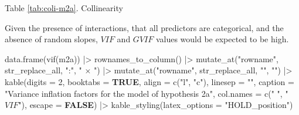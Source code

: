 \documentclass[
  bookmarksnumbered]{article}
\newenvironment{Shaded}{\begin{snugshade}}{\end{snugshade}}
\newcommand{\AttributeTok}[1]{\textcolor[rgb]{0.80,0.80,0.80}{#1}}
\newcommand{\ConstantTok}[1]{\textcolor[rgb]{0.86,0.64,0.64}{\textbf{#1}}}
\newcommand{\DecValTok}[1]{\textcolor[rgb]{0.86,0.86,0.80}{#1}}
\newcommand{\FunctionTok}[1]{\textcolor[rgb]{0.94,0.94,0.56}{#1}}
\newcommand{\NormalTok}[1]{\textcolor[rgb]{0.80,0.80,0.80}{#1}}
\newcommand{\SpecialCharTok}[1]{\textcolor[rgb]{0.86,0.64,0.64}{#1}}
\newcommand{\StringTok}[1]{\textcolor[rgb]{0.80,0.58,0.58}{#1}}
\begin{document}
Table \ref{tab:coli-m2a}. Collinearity

Given the presence of interactions, that all predictors are categorical, and the absence of random slopes, \(VIF\) and \(GVIF\) values would be expected to be high.

\begin{Shaded}
\begin{Highlighting}[]
\FunctionTok{data.frame}\NormalTok{(}\FunctionTok{vif}\NormalTok{(m2a)) }\SpecialCharTok{|\textgreater{}} 
  \FunctionTok{rownames\_to\_column}\NormalTok{() }\SpecialCharTok{|\textgreater{}} 
  \FunctionTok{mutate\_at}\NormalTok{(}\StringTok{"rowname"}\NormalTok{, str\_replace\_all, }\StringTok{":"}\NormalTok{, }\StringTok{" × "}\NormalTok{) }\SpecialCharTok{|\textgreater{}}
  \FunctionTok{mutate\_at}\NormalTok{(}\StringTok{"rowname"}\NormalTok{, str\_replace\_all, }\StringTok{"\textasciigrave{}"}\NormalTok{, }\StringTok{""}\NormalTok{) }\SpecialCharTok{|\textgreater{}} 
  \FunctionTok{kable}\NormalTok{(}\AttributeTok{digits =} \DecValTok{2}\NormalTok{,}
        \AttributeTok{booktabs =} \ConstantTok{TRUE}\NormalTok{,}
        \AttributeTok{align =} \FunctionTok{c}\NormalTok{(}\StringTok{"l"}\NormalTok{, }\StringTok{"c"}\NormalTok{),}
        \AttributeTok{linesep =} \StringTok{""}\NormalTok{,}
        \AttributeTok{caption =} \StringTok{"Variance inflation factors for the model of hypothesis 2a"}\NormalTok{,}
        \AttributeTok{col.names =} \FunctionTok{c}\NormalTok{(}\StringTok{" "}\NormalTok{,}
                      \StringTok{"$VIF$"}\NormalTok{),}
        \AttributeTok{escape =} \ConstantTok{FALSE}\NormalTok{) }\SpecialCharTok{|\textgreater{}}
  \FunctionTok{kable\_styling}\NormalTok{(}\AttributeTok{latex\_options =} \StringTok{"HOLD\_position"}\NormalTok{)}
\end{Highlighting}
\end{Shaded}
\end{document}
